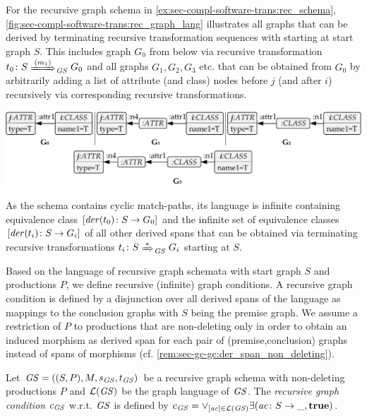 \begin{example}
\label{ex:sec-compl-software-trans:lang_rec_schema}
For the recursive graph schema in \cref{ex:sec-compl-software-trans:rec_schema}, \cref{fig:sec-compl-software-trans:rec_graph_lang} illustrates all graphs that can be derived by terminating recursive transformation sequences with starting at start graph $S$.
This includes graph $G_0$ from below via recursive transformation $t_0\colon S \Trans{(m_1)}_\GS G_0$ and all graphs $G_1,G_2,G_3$ etc. that can be obtained from $G_0$ by arbitrarily adding a list of attribute (and class) nodes before $j$ (and after $i$) recursively via corresponding recursive transformations.
\begin{center}
\includegraphics[width=.96\textwidth]{img/software_trans/graphs.pdf}
\end{center}
As the schema contains cyclic match-paths, its language is infinite containing equivalence class $[\mathit{der}(t_0)\colon S \to G_0]$ and the infinite set of equivalence classes $[\mathit{der}(t_i)\colon S \to G_i]$ of all other derived spans that can be obtained via terminating recursive transformations $t_i\colon S \Trans{*}_\GS G_i$ starting at $S$.
\envEndMarker
\end{example}

Based on the language of recursive graph schemata with start graph $S$ and productions $P$, we define recursive (infinite) graph conditions.
A recursive graph condition is defined by a disjunction over all derived spans of the language as mappings to the conclusion graphs with $S$ being the premise graph.
We assume a restriction of $P$ to productions that are non-deleting only in order to obtain an induced morphism as derived span for each pair of (premise,conclusion) graphs instead of spans of morphisms (cf. \cref{rem:sec-gc-gc:der_span_non_deleting}).

\begin{definition}
\label{def:sec-compl-software-trans:sem_rec_cond}
Let $\mathit{GS}=((S,P),M,s_\mathit{GS},t_\mathit{GS})$ be a recursive graph schema with non-deleting productions $P$ and $\mathcal{L}(\mathit{GS})$ be the graph language of $\mathit{GS}$.
The \emph{recursive graph condition $c_\mathit{GS}$} w.r.t. $\mathit{GS}$ is defined by $c_\mathit{GS}=\vee_{[\mathit{ac}] \in \mathcal{L}(\mathit{GS})}\exists(\mathit{ac}\colon S \to \_,\textbf{true})$.
\envEndMarker
\end{definition}

